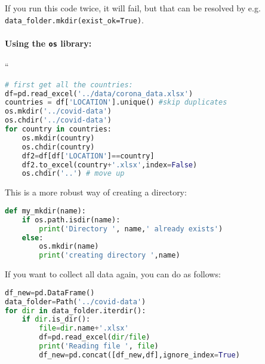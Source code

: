 \documentclass[graybox,sectrefs,envcountresetchap,open=right,final]{svmonodo}
\begin{document}
If you run this code twice, it will fail, but that can be resolved by e.g. \Verb!data_folder.mkdir(exist_ok=True)!.  

\paragraph{Using the \texttt{os} library:}
``












\begin{lstlisting}[language=python,style=blue1bar]
# first get all the countries:
df=pd.read_excel('../data/corona_data.xlsx')
countries = df['LOCATION'].unique() #skip duplicates
os.mkdir('../covid-data')
os.chdir('../covid-data')
for country in countries:
    os.mkdir(country)
    os.chdir(country)
    df2=df[df['LOCATION']==country]
    df2.to_excel(country+'.xlsx',index=False)
    os.chdir('..') # move up

\end{lstlisting}


This is a more robust way of creating a directory:







\begin{lstlisting}[language=python,style=blue1bar]
def my_mkdir(name):
    if os.path.isdir(name):
        print('Directory ', name,' already exists')
    else:
        os.mkdir(name)
        print('creating directory ',name)

\end{lstlisting}


If you want to collect all data again, you can do as follows:









\begin{lstlisting}[language=python,style=blue1bar]
df_new=pd.DataFrame()
data_folder=Path('../covid-data')
for dir in data_folder.iterdir():
    if dir.is_dir():      
        file=dir.name+'.xlsx'
        df=pd.read_excel(dir/file)
        print('Reading file ', file)
        df_new=pd.concat([df_new,df],ignore_index=True)

\end{lstlisting}
\end{document}
